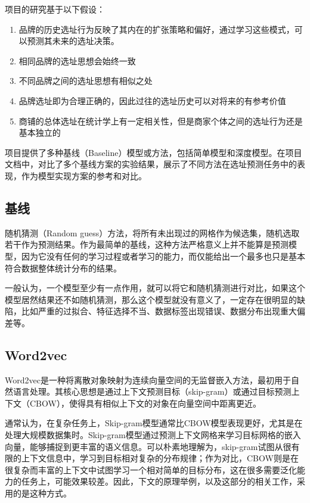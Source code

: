 \documentclass{article}
\begin{document}
项目的研究基于以下假设：
\begin{enumerate}
    \item 品牌的历史选址行为反映了其内在的扩张策略和偏好，通过学习这些模式，可以预测其未来的选址决策。
    \item 相同品牌的选址思想会始终一致
    \item 不同品牌之间的选址思想有相似之处
    \item 品牌选址即为合理正确的，因此过往的选址历史可以对将来的有参考价值
    \item 商铺的总体选址在统计学上有一定相关性，但是商家个体之间的选址行为还是基本独立的
\end{enumerate}

项目提供了多种基线（Baseline）模型或方法，包括简单模型和深度模型。在项目文档中，对比了多个基线方案的实验结果，展示了不同方法在选址预测任务中的表现，作为模型实现方案的参考和对比。

\subsection{基线}

随机猜测（Random guess）方法，将所有未出现过的网格作为候选集，随机选取若干作为预测结果\cite{Dietterich1998Approximate}。作为最简单的基线，这种方法严格意义上并不能算是预测模型，因为它没有任何的学习过程或者学习的能力，而仅能给出一个最多也只是基本符合数据整体统计分布的结果。

一般认为，一个模型至少有一点作用，就可以将它和随机猜测进行对比，如果这个模型居然结果还不如随机猜测，那么这个模型就没有意义了，一定存在很明显的缺陷，比如严重的过拟合、特征选择不当、数据标签出现错误、数据分布出现重大偏差等\cite{Domingos2012MLthingstoknow}。


\subsection{Word2vec}

Word2vec是一种将离散对象映射为连续向量空间的无监督嵌入方法，最初用于自然语言处理。其核心思想是通过上下文预测目标（skip-gram）或通过目标预测上下文（CBOW），使得具有相似上下文的对象在向量空间中距离更近\cite{word2vec}。

通常认为，在复杂任务上，Skip-gram模型通常比CBOW模型表现更好，尤其是在处理大规模数据集时。Skip-gram模型通过预测上下文网格来学习目标网格的嵌入向量，能够捕捉到更丰富的语义信息。可以朴素地理解为，skip-gram试图从很有限的上下文信息中，学习到目标相对复杂的分布规律；作为对比，CBOW则是在很复杂而丰富的上下文中试图学习一个相对简单的目标分布，这在很多需要泛化能力的任务上，可能效果较差\cite{menon_empirical_2020}。因此，下文的原理举例，以及这部分的相关工作，采用的是这种方式。
\end{document}

